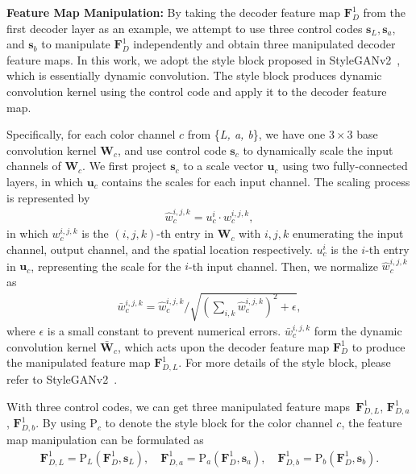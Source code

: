 \documentclass[sigconf]{acmart}
\begin{document}
\noindent\textbf{Feature Map Manipulation: }By taking the decoder feature map $\bm{F}_{D}^{1}$ from the first decoder layer as an example, we attempt to use three control codes $\bm{s}_{\textit{L}}, \bm{s}_{\textit{a}}$, and $\bm{s}_{\textit{b}}$ to manipulate $\bm{F}_{D}^{1}$ independently and obtain three manipulated decoder feature maps. 
In this work, we adopt the style block proposed in StyleGANv2~\cite{styleganv2}, which is essentially dynamic convolution. The style block produces dynamic convolution kernel using the control code and apply it to the decoder feature map. 

Specifically, for each color channel $c$ from \{\textit{L, a, b}\}, we have one $3\times 3$ base convolution kernel $\bm{W}_{c}$, and use control code $\bm{s}_{\textit{c}}$ to dynamically scale the input channels of $\bm{W}_{c}$. We first project $\bm{s}_{\textit{c}}$ to a scale vector $\bm{u}_{\textit{c}}$ using two fully-connected layers, in which $\bm{u}_{\textit{c}}$ contains the scales for each input channel. The scaling process is represented by
\begin{eqnarray}
      \hat{w}_{c}^{i, j, k} =  u_{c}^{i} \cdot {w}_{c}^{i, j, k},
\end{eqnarray}
in which $w_{c}^{i, j, k}$ is the $(i,j,k)$-th entry in $\bm{W}_{c}$ with $i, j, k$ enumerating the input channel, output channel, and the spatial location respectively. $u_{c}^{i}$ is the $i$-th entry in $\bm{u}_{\textit{c}}$, representing the scale for the $i$-th input channel. Then, we normalize $\hat{w}_{c}^{i, j, k}$ as
\begin{eqnarray}
      \bar{w}_{c}^{i, j, k} = \hat{w}_{c}^{i, j, k} \bigg/ \sqrt{(\sum_{i, k} \hat{w}_{c}^{i, j, k})^2 + \epsilon},
\end{eqnarray}
where $\epsilon$ is a small constant to prevent numerical errors. $\bar{w}_{c}^{i, j, k}$ form the dynamic convolution kernel $\bm{\bar{W}}_{c}$, which acts upon the decoder feature map $\bm{F}_{D}^{1}$ to produce the manipulated feature map $\bm{F}_{D, \textit{L}}^{1}$. For more details of the style block, please refer to StyleGANv2~\cite{styleganv2}.

With three control codes, we can get three manipulated feature maps~$\bm{F}_{D, \textit{L}}^{1}$, $\bm{F}_{D, \textit{a}}^{1}$, $\bm{F}_{D, \textit{b}}^{1}$. By using  P$_{c}$ to denote the style block for the color channel $c$, the feature map manipulation can be formulated as
\begin{equation}
    \begin{aligned}
      \bm{F}_{D, \textit{L}}^{1} \!=\! \text{P}_\textit{L}(\bm{F}_{D}^{1}, \bm{s}_{\textit{L}}), \quad
      \bm{F}_{D, \textit{a}}^{1} \!=\! \text{P}_\textit{a}(\bm{F}_{D}^{1}, \bm{s}_{\textit{a}}), \quad
      \bm{F}_{D, \textit{b}}^{1} \!=\! \text{P}_\textit{b}(\bm{F}_{D}^{1}, \bm{s}_{\textit{b}}).
    \end{aligned}
\end{equation}
\end{document}
